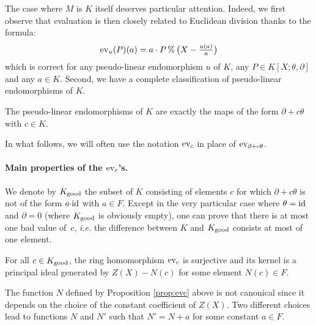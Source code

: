 \documentclass[a4paper]{llncs}
\newcommand{\id}{\textrm{\rm id}}
\newcommand{\ev}[1]{\textrm{\rm ev}_{#1}}
\renewcommand{\mod}{\,\%\,}
\newcommand{\good}{\textrm{\rm good}}
\begin{document}
The case where $M$ is $K$ itself deserves particular attention.
Indeed, we first observe that evaluation is then closely related to
Euclidean division thanks to the formula:
\begin{equation}
\label{eq:evanddiv}
\textstyle \ev{u}(P)(a) = 
a \cdot P \mod \big(X - \frac{u(a)}{a}\big)
\end{equation}
which is correct for any pseudo-linear endomorphism $u$ of $K$, any $P 
\in K[X;\theta, \partial]$ and any $a \in K$. Second, we have a complete 
classification of pseudo-linear endomorphisms of $K$.

\begin{proposition}
The pseudo-linear endomorphisms of $K$ are exactly the maps of
the form $\partial + c\theta$ with $c \in K$.
\end{proposition}

In what follows, we will often use the notation $\ev c$ in place of 
$\ev{\partial + c \theta}$.

\paragraph{Main properties of the $\ev c$'s.}

We denote by $K_\good$ the subset of $K$ consisting of elements $c$ for 
which $\partial + c\theta$ is not of the form $a{\cdot}\id$ with $a \in 
F$. Except in the very particular case where $\theta = \id$ and 
$\partial = 0$ (where $K_\good$ is obviously empty), one can prove that 
there is at most one bad value of~$c$, \emph{i.e.} the difference 
between $K$ and $K_\good$ consists at most of one element.

\begin{proposition}
\label{prop:evc}
For all $c \in K_\good$, the ring homomorphism $\ev{c}$ is surjective
and its kernel is a principal ideal generated by $Z(X) - N(c)$
for some element $N(c) \in F$.
\end{proposition}

\begin{remark}
The function $N$ defined by Proposition \ref{prop:evc} above is not 
canonical since it depends on the choice of the constant coefficient 
of $Z(X)$. Two different choices lead to functions $N$ and $N'$ such
that $N' = N + a$ for some constant $a \in F$.
\end{remark}

\end{document}
